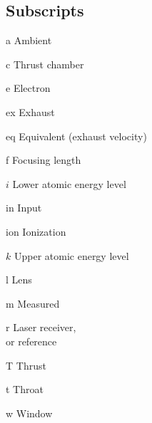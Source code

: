 \begin{multicols}{2}
    \section*{Subscripts}
    \begin{nomlist}
        \item[a]                Ambient
        \item[c]                Thrust chamber
        \item[e]                Electron
        \item[ex]               Exhaust
        \item[eq]               Equivalent (exhaust velocity)
        \item[f]                Focusing length
        \item[$i$]              Lower atomic energy level 
        \item[in]               Input
        \item[ion]              Ionization
        \item[$k$]              Upper atomic energy level 
        \item[l]                Lens
        \item[m]                Measured
        \item[r]                Laser receiver, \\or reference
        \item[T]                Thrust
        \item[t]                Throat
        \item[w]                Window
    \end{nomlist}


\end{multicols}